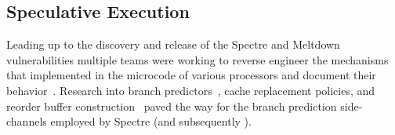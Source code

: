 



\subsection{Speculative Execution}

Leading up to the discovery and release of the Spectre and Meltdown
vulnerabilities multiple teams were working to reverse engineer the mechanisms
that implemented in the microcode of various processors and document their
behavior~\cite{intel-instruction-tables,project_zero,measuring-cache,measuring-rob}.
Research into branch predictors~\cite{godbolt2016branch}, cache replacement
policies, and reorder buffer construction~\cite{measuring-rob} paved the way for
the branch prediction side-channels employed by Spectre (and subsequently
\speculake).

